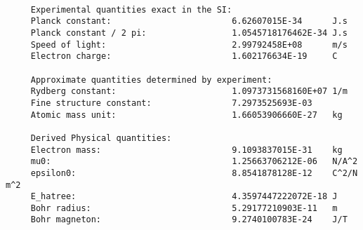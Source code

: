 \documentclass[12pt,a4paper]{article}
\begin{document}
\begin{verbatim}

     Experimental quantities exact in the SI:
     Planck constant:                        6.62607015E-34      J.s
     Planck constant / 2 pi:                 1.0545718176462E-34 J.s
     Speed of light:                         2.99792458E+08      m/s
     Electron charge:                        1.602176634E-19     C

     Approximate quantities determined by experiment:
     Rydberg constant:                       1.0973731568160E+07 1/m
     Fine structure constant:                7.2973525693E-03
     Atomic mass unit:                       1.66053906660E-27   kg

     Derived Physical quantities:
     Electron mass:                          9.1093837015E-31    kg
     mu0:                                    1.25663706212E-06   N/A^2
     epsilon0:                               8.8541878128E-12    C^2/N m^2
     E_hatree:                               4.3597447222072E-18 J
     Bohr radius:                            5.29177210903E-11   m
     Bohr magneton:                          9.2740100783E-24    J/T


\end{verbatim}
\end{document}

